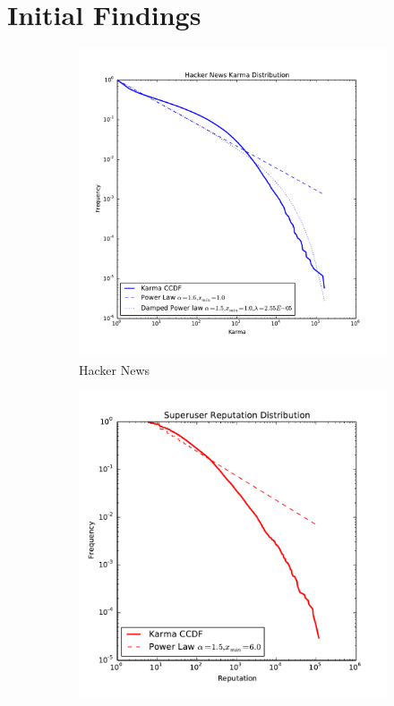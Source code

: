 \documentclass[10pt]{article}
\begin{document}
\section*{Initial Findings}

\begin{figure}[h]
\centering
\begin{subfigure}{0.49\textwidth}
\centering
\includegraphics[width=\linewidth]{hn_karma_distribution}
\caption{Hacker News}
\label{fig:hnkarma}
\end{subfigure}%
\begin{subfigure}{0.49\textwidth}
\centering
\includegraphics[width=\linewidth]{su_karma_distribution}

\end{subfigure}
\end{figure}
\end{document}
